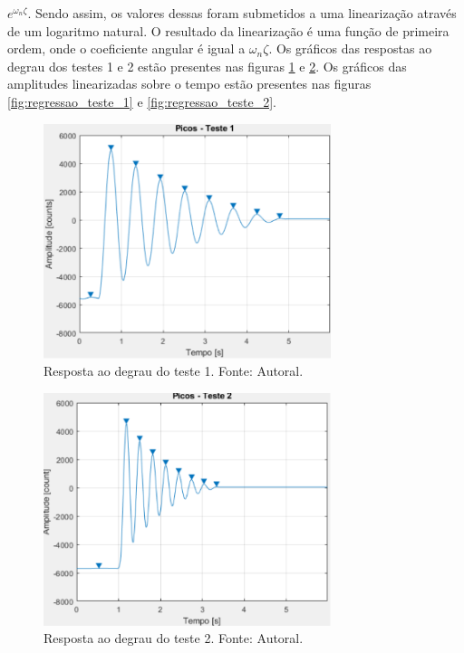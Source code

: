 \documentclass{ifacconf}
\begin{document}
$e^{\omega_n \zeta}$. Sendo assim, os valores dessas foram submetidos a uma linearização através de um logaritmo
natural. O resultado da linearização é uma função de primeira ordem, onde o coeficiente angular é igual a $\omega_n \zeta$.
Os gráficos das respostas ao degrau dos testes 1 e 2 estão presentes nas figuras \ref{fig:picos_teste_1} e \ref{fig:picos_teste_2}.
Os gráficos das amplitudes linearizadas sobre o tempo estão presentes nas figuras \ref{fig:regressao_teste_1} e \ref{fig:regressao_teste_2}.
\begin{figure}[!htb]
  \begin{center}
  \includegraphics[width=8.4cm]{figures/picos_teste_1.png}    %
  \caption{Resposta ao degrau do teste 1. Fonte: Autoral.} 
  \label{fig:picos_teste_1}
  \end{center}
\end{figure}

\begin{figure}[!htb]
  \begin{center}
  \includegraphics[width=8.4cm]{figures/picos_teste_2.png}    %
  \caption{Resposta ao degrau do teste 2. Fonte: Autoral.} 
  \label{fig:picos_teste_2}
  \end{center}
\end{figure}
\end{document}
